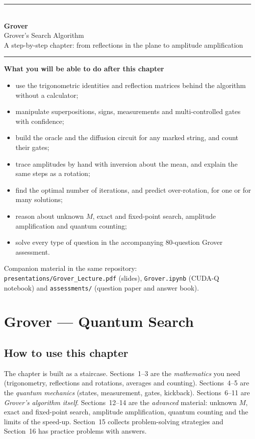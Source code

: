 \documentclass[11pt,a4paper,openany]{book}
\begin{document}
\begin{titlepage}
\centering
{\color{brand}\rule{\linewidth}{1.5pt}}\\[10pt]
{\Huge\bfseries\color{brand} Grover}\\[8pt]
{\LARGE Grover's Search Algorithm}\\[6pt]
{\large A step-by-step chapter: from reflections in the plane to amplitude amplification}\\[6pt]
{\color{brand}\rule{\linewidth}{1.5pt}}
\vspace{18mm}

\begin{minipage}{0.86\linewidth}
\large
\textbf{What you will be able to do after this chapter}
\begin{itemize}[itemsep=3pt]
\item use the trigonometric identities and reflection matrices behind the algorithm without a calculator;
\item manipulate superpositions, signs, measurements and multi-controlled gates with confidence;
\item build the oracle and the diffusion circuit for any marked string, and count their gates;
\item trace amplitudes by hand with inversion about the mean, and explain the same steps as a rotation;
\item find the optimal number of iterations, and predict over-rotation, for one or for many solutions;
\item reason about unknown $M$, exact and fixed-point search, amplitude amplification and quantum counting;
\item solve every type of question in the accompanying 80-question Grover assessment.
\end{itemize}
\end{minipage}
\vfill
{\small Companion material in the same repository: \texttt{presentations/Grover\_Lecture.pdf} (slides),
\texttt{Grover.ipynb} (CUDA-Q notebook) and \texttt{assessments/} (question paper and answer book).}
\end{titlepage}

\tableofcontents
\setcounter{chapter}{0}
\chapter*{Grover --- Quantum Search}

\section*{How to use this chapter}
The chapter is built as a staircase. Sections~1--3 are the \emph{mathematics} you need (trigonometry, reflections and
rotations, averages and counting). Sections~4--5 are the \emph{quantum mechanics} (states, measurement, gates, kickback).
Sections~6--11 are \emph{Grover's algorithm itself}. Sections~12--14 are the \emph{advanced} material: unknown $M$, exact
and fixed-point search, amplitude amplification, quantum counting and the limits of the speed-up. Section~15 collects
problem-solving strategies and Section~16 has practice problems with answers.
\end{document}
